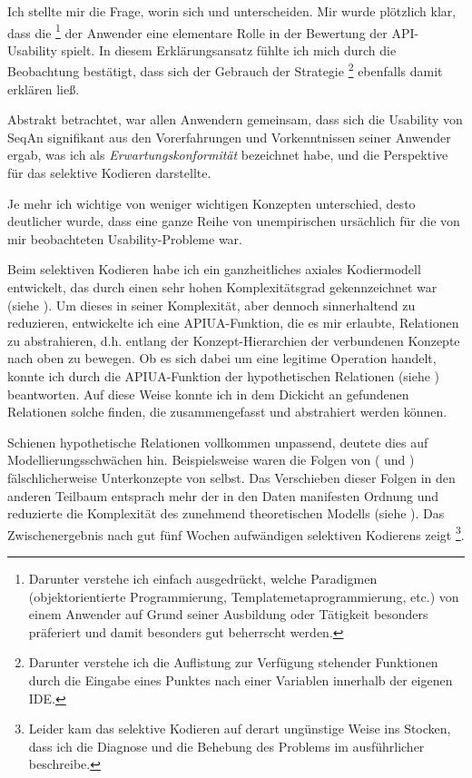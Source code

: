Ich stellte mir die Frage, worin sich  und  unterscheiden. Mir wurde plötzlich klar, dass die \footnote{Darunter verstehe ich einfach ausgedrückt, welche Paradigmen (objektorientierte Programmierung, Templatemetaprogrammierung, etc.) von einem Anwender auf Grund seiner Ausbildung oder Tätigkeit besonders präferiert und damit besonders gut beherrscht werden.} der Anwender eine elementare Rolle in der Bewertung der API-Usability spielt. In diesem Erklärungsansatz fühlte ich mich durch die Beobachtung bestätigt, dass sich der Gebrauch der Strategie \footnote{Darunter verstehe ich die Auflistung zur Verfügung stehender Funktionen durch die Eingabe eines Punktes nach einer Variablen innerhalb der eigenen IDE.} ebenfalls damit erklären ließ.

Abstrakt betrachtet, war allen Anwendern gemeinsam, dass sich die Usability von SeqAn signifikant aus den Vorerfahrungen und Vorkenntnissen seiner Anwender ergab, was ich als \textit{Erwartungskonformität} bezeichnet habe, und die Perspektive für  das selektive Kodieren darstellte.

Je mehr ich wichtige von weniger wichtigen Konzepten unterschied, desto deutlicher wurde, dass eine ganze Reihe von unempirischen  ursächlich für die von mir beobachteten Usability-Probleme war.

Beim selektiven Kodieren habe ich ein ganzheitliches axiales Kodiermodell entwickelt, das durch einen sehr hohen Komplexitätsgrad gekennzeichnet war (siehe ). Um dieses in seiner Komplexität, aber dennoch sinnerhaltend zu reduzieren, entwickelte ich eine APIUA-Funktion, die es mir erlaubte, Relationen zu abstrahieren, d.h. entlang der Konzept-Hierarchien der verbundenen Konzepte nach oben zu bewegen. Ob es sich dabei um eine legitime Operation handelt, konnte ich durch die APIUA-Funktion der hypothetischen Relationen (siehe ) beantworten. Auf diese Weise konnte ich in dem Dickicht an gefundenen Relationen solche finden, die zusammengefasst und abstrahiert werden können.

Schienen hypothetische Relationen vollkommen unpassend, deutete dies auf Modellierungsschwächen hin. Beispielsweise waren die Folgen von  ( und ) fälschlicherweise Unterkonzepte von  selbst. Das Verschieben dieser Folgen in den anderen Teilbaum  entsprach mehr der in den Daten manifesten Ordnung und reduzierte die Komplexität des zunehmend theoretischen Modells (siehe ). Das Zwischenergebnis nach gut fünf Wochen aufwändigen selektiven Kodierens zeigt \footnote{Leider kam das selektive Kodieren auf derart ungünstige Weise ins Stocken, dass ich die Diagnose und die Behebung des Problems im  ausführlicher beschreibe.}.


